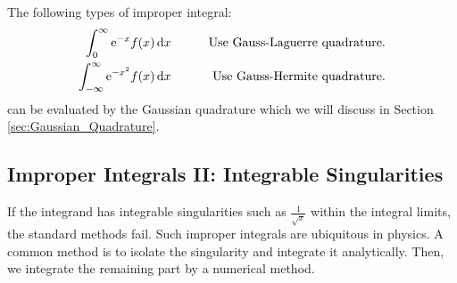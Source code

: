  The following types of improper integral:
\begin{eqnarray}
\int_0^\infty \text{e}^{-x} f(x) \dd{x} &\qquad& \text{Use Gauss-Laguerre quadrature.} \\
\int_{-\infty}^{\infty} \text{e}^{-x^2} f(x) \dd{x} &\qquad& \text{Use Gauss-Hermite quadrature.}
\end{eqnarray}
can be evaluated by the Gaussian quadrature which we will discuss in Section \ref{sec:Gaussian_Quadrature}.

\noindent
\subsection{Improper Integrals II:  Integrable Singularities}

If the integrand has integrable singularities such as $\displaystyle\frac{1}{\sqrt{x}}$ within the integral limits, the standard methods fail. Such improper integrals are ubiquitous in physics.  A common method is to isolate the singularity and integrate it analytically.  Then, we integrate the remaining part by a numerical method.  



